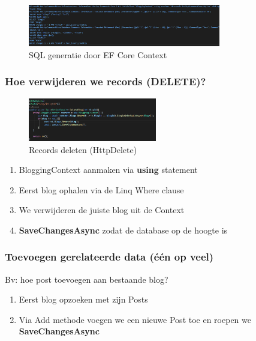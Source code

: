 \documentclass{article}
\begin{document}
\begin{figure}[H]
    \centering
    \includegraphics[width=0.75\textwidth]{efcore-insert2.png}
    \caption{SQL generatie door EF Core Context}
\end{figure}


\subsubsection{Hoe verwijderen we records (DELETE)?}

\begin{figure}[H]
    \centering
    \includegraphics[width=0.5\textwidth]{efcore-delete.png}
    \caption{Records deleten (HttpDelete)}
\end{figure}

\begin{enumerate}
    \item BloggingContext aanmaken via \textbf{using} statement
    \item Eerst blog ophalen via de Linq Where clause
    \item We verwijderen de juiste blog uit de Context
    \item \textbf{SaveChangesAsync} zodat de database op de hoogte is
\end{enumerate}

\subsubsection{Toevoegen gerelateerde data (één op veel)}

Bv: hoe post toevoegen aan bestaande blog?

\begin{enumerate}
    \item Eerst blog opzoeken met zijn Posts
    \item Via Add methode voegen we een nieuwe Post toe en roepen we \textbf{SaveChangesAsync}
\end{enumerate}
\end{document}
